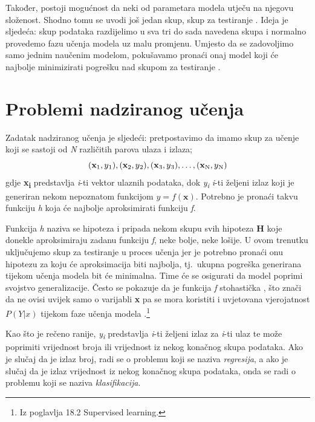 \documentclass[times, utf8, zavrsni]{fer}
\begin{document}
Također, postoji mogućnost da neki od parametara modela utječu na njegovu složenost. Shodno tomu se uvodi još jedan skup, skup za testiranje . Ideja je sljedeća: skup podataka razdijelimo u sva tri do sada navedena skupa i normalno provedemo fazu učenja modela uz malu promjenu. Umjesto da se zadovoljimo samo jednim naučenim modelom, pokušavamo pronaći onaj model koji će najbolje minimizirati pogrešku nad skupom za testiranje \citep{cupicML}.

\section{Problemi nadziranog učenja}
Zadatak nadziranog učenja je sljedeći: pretpostavimo da imamo skup za učenje koji se sastoji od \textit{N} različitih parova ulaza i izlaza;
\[(\textbf{x}\textsubscript{1}, y\textsubscript{1}), (\textbf{x}\textsubscript{2}, y\textsubscript{2}),
(\textbf{x}\textsubscript{3}, y\textsubscript{3}),\dots,
(\textbf{x}\textsubscript{N}, y\textsubscript{N})\]
gdje \textbf{x\textsubscript{i}} predstavlja \textit{i}-ti vektor ulaznih podataka, dok \textit{y\textsubscript{i}} \textit{i}-ti željeni izlaz koji je generiran nekom nepoznatom funkcijom $y=f(\textbf{x})$. \newline
Potrebno je pronaći takvu funkciju \textit{h} koja će najbolje aproksimirati funkciju \textit{f}.

Funkcija \textit{h} naziva se hipoteza  i pripada nekom skupu svih hipoteza \textbf{H} koje donekle aproksimiraju zadanu funkciju \textit{f}, neke bolje, neke lošije. U ovom trenutku uključujemo skup za testiranje u proces učenja jer je potrebno pronaći onu hipotezu za koju će aproksimacija biti najbolja, tj.\ ukupna pogreška generirana tijekom učenja modela bit će minimalna. Time će se osigurati da model poprimi svojstvo generalizacije. Često se pokazuje da je funkcija \textit{f} stohastička , što znači da ne ovisi uvijek samo o varijabli \textbf{x} pa se mora koristiti i uvjetovana vjerojatnost $P(Y|x)$ tijekom faze učenja modela \citep{russelAI}.\footnote{Iz poglavlja 18.2 Supervised learning.}

Kao što je rečeno ranije, \textit{y\textsubscript{i}} predstavlja \textit{i}-ti željeni izlaz za \textit{i}-ti ulaz te može poprimiti vrijednost broja ili vrijednost iz nekog konačnog skupa podataka. Ako je slučaj da je izlaz broj, radi se o problemu koji se naziva \textit{regresija}, a ako je slučaj da je izlaz vrijednost iz nekog konačnog skupa podataka, onda se radi o problemu koji se naziva \textit{klasifikacija}.
\end{document}
